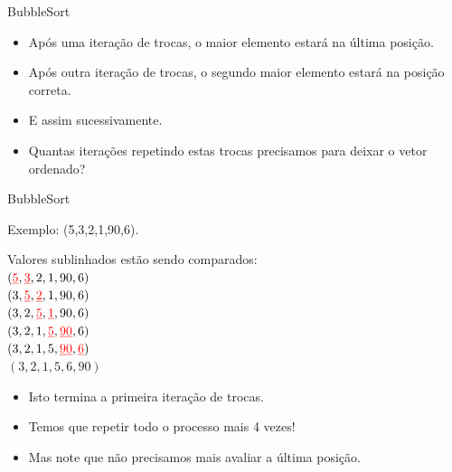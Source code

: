 \documentclass[handout]{beamer}
\begin{document}
\begin{frame}[fragile]{BubbleSort}

    \begin{itemize}
        \item Após uma iteração de trocas, o maior elemento estará na última posição.
        \item Após outra iteração de trocas, o segundo maior elemento estará na posição correta.
        \item E assim sucessivamente.
        \item Quantas iterações repetindo estas trocas precisamos para deixar o vetor ordenado?
    \end{itemize}

\end{frame}

\begin{frame}[fragile]{BubbleSort}

    Exemplo: (5,3,2,1,90,6).

    Valores sublinhados estão sendo comparados:\\
    $({\color{red}\underline{5}},{\color{red}\underline{3}},2,1,90,6)$\\
    $(3,{\color{red}\underline{5}},{\color{red}\underline{2}},1,90,6)$\\
    $(3,2,{\color{red}\underline{5}},{\color{red}\underline{1}},90,6)$\\
    $(3,2,1,{\color{red}\underline{5}},{\color{red}\underline{90}},6)$\\
    $(3,2,1,5,{\color{red}\underline{90}},{\color{red}\underline{6}})$\\
    $(3,2,1,5,6,90)$
    
    \begin{itemize}
        \item Isto termina a primeira iteração de trocas.
        \item Temos que repetir todo o processo mais 4 vezes!
        \item Mas note que não precisamos mais avaliar a última posição.
    \end{itemize}

\end{frame}
\end{document}
